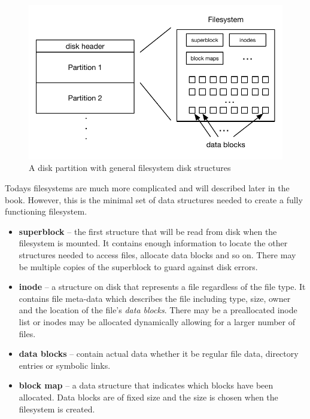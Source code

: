 \begin{figure}[h]
	\includegraphics[scale=0.6]{figures/basic-disk-layout.pdf}
	\centering
	\caption{A disk partition with general filesystem disk structures}
	\label{fig:basic-disk-layout}
\end{figure}

\noindent
Todays filesystems are much more complicated and will described later in the book. However, this is the minimal set of data structures needed to create a fully functioning filesystem.

\begin{itemize}
	\item \textbf{superblock} -- the first structure that will be read from disk when the filesystem is mounted. It contains enough 
		information to locate the other structures needed to access files, allocate data blocks and so on. There may
		be multiple copies of the superblock to guard against disk errors. 
	\item \textbf{inode} -- a structure on disk that represents a file regardless of the file type. It contains file meta-data which 
		describes the file including type, size, owner and the location of the file's \textit{data blocks}. There may be
		a preallocated inode list or inodes may be allocated dynamically allowing for a larger number of files.
	\item \textbf{data blocks} -- contain actual data whether it be regular file data, directory entries or symbolic links.
	\item \textbf{block map} -- a data structure that indicates which blocks have been allocated. Data blocks are of fixed size and
		the size is chosen when the filesystem is created.
\end{itemize}

